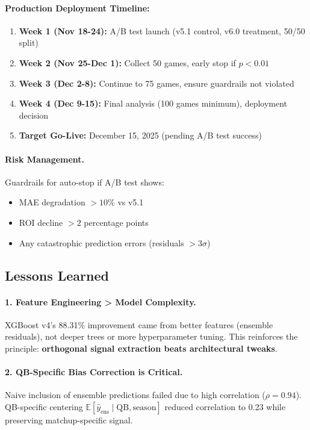 \paragraph{Production Deployment Timeline:}
\begin{enumerate}[itemsep=2pt,parsep=0pt]
    \item \textbf{Week 1 (Nov 18-24):} A/B test launch (v5.1 control, v6.0 treatment, 50/50 split)
    \item \textbf{Week 2 (Nov 25-Dec 1):} Collect 50 games, early stop if $p < 0.01$
    \item \textbf{Week 3 (Dec 2-8):} Continue to 75 games, ensure guardrails not violated
    \item \textbf{Week 4 (Dec 9-15):} Final analysis (100 games minimum), deployment decision
    \item \textbf{Target Go-Live:} December 15, 2025 (pending A/B test success)
\end{enumerate}

\paragraph{Risk Management.}
Guardrails for auto-stop if A/B test shows:
\begin{itemize}[itemsep=2pt,parsep=0pt]
    \item MAE degradation $> 10\%$ vs v5.1
    \item ROI decline $> 2$ percentage points
    \item Any catastrophic prediction errors (residuals $> 3\sigma$)
\end{itemize}

\subsection{Lessons Learned}

\paragraph{1. Feature Engineering > Model Complexity.}
XGBoost v4's 88.31\% improvement came from better features (ensemble residuals), not deeper trees or more hyperparameter tuning. This reinforces the principle: \textbf{orthogonal signal extraction beats architectural tweaks}.

\paragraph{2. QB-Specific Bias Correction is Critical.}
Naive inclusion of ensemble predictions failed due to high correlation ($\rho = 0.94$). QB-specific centering $\mathbb{E}[\hat{y}_{\text{ens}} \mid \text{QB}, \text{season}]$ reduced correlation to 0.23 while preserving matchup-specific signal.

